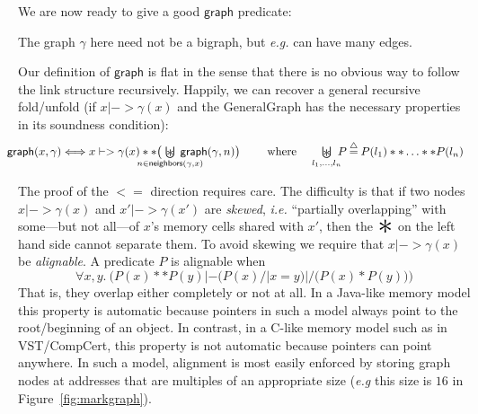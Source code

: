 \documentclass[acmsmall,screen]{acmart}
\newcommand\hide[1]{}
\newcommand{\scon}{\mathbin{\star}}
\renewcommand{\scon}{\mathbin{\ast}} \renewcommand{\bigstar}{\raisebox{-0.24em}{{\scaleobj{2.5}{\scon}}}}
\newcommand{\bigocon}{\raisebox{-0.3ex}{\resizebox{0.75em}{!}{\hspace{0.05em}$\scon$}}\hspace{-2.18ex} \bigcup}
\newcommand{\defeq}{\mathbin{\stackrel{\triangle}{=}}}
\newcommand{\p}[1]{\ensuremath{\mathsf{#1}}} \newcommand{\m}[1]{\ensuremath{\mathit{#1}}} \newcommand{\ma}[1]{\ensuremath{\mathcal{#1}}} \let\ramify\lightning
\begin{document}
We are now ready to give a good \p{graph} predicate:
\fi


\hide{ \vspace{-1.5ex}
\begin{equation}\label{eqn:iter_def}
  \p{graph}(x, \gamma) ~~ \defeq ~~ \underset{v \in \mathit{reach}(\gamma, x)}{\bigstar} v\mapsto\gamma(v)
\vspace{-1.5ex}
\end{equation}
$\gamma$ is a GeneralGraph and ``$x |-> \gamma(x)$'' is a predicate that says how a single node fits in memory. In Figure~\ref{fig:markgraph} it was:
\[
\exists m,l,r.~\gamma(x) = (m,l,r) /| x |-> m,-,l,r /| x\ \p{mod}\ 16 = 0
\]}
The graph $\gamma$ here need not be a bigraph, but \emph{e.g.} can have many edges.

Our definition of \p{graph} is flat in the sense that there is no obvious way to follow the link structure recursively.  Happily, we can recover a general recursive fold/unfold (if $x |-> \gamma(x)$ and the GeneralGraph has the necessary properties in its soundness condition):
\vspace{-1ex}
\begin{equation}
\label{eqn:unfold_graph}
\hspace{-1em}\begin{array}{@{}lc@{\hspace{1pt}}c@{\hspace{1pt}}l@{}}
\p{graph}(x,\gamma)  <=>  x |-> \gamma(x) ** \big(\!\!\!\!\!\!\!\!\!\!\!\!\!\underset{n \in \p{neighbors}(\gamma,x)}{\bigocon}\!\!\!\!\!\!\!\!\!\!\!\! \p{graph}(\gamma,n) \big)
\quad \text{~~~ where ~~ }\underset{l_1,\dots,l_n}{\raisebox{-0.3ex}{\resizebox{0.75em}{!}{\hspace{0.05em}$\scon$}}\hspace{-2.18ex} \bigcup} \! \! P  \defeq  P(l_1) ** \ldots ** P(l_n) \end{array}
\vspace{-1ex}
\end{equation}

The proof of the $<=$ direction requires care. The difficulty is that if two nodes $x |-> \gamma(x)$ and $x' |-> \gamma(x')$ are \emph{skewed}, \emph{i.e.} ``partially overlapping'' with some---but not all---of $x$'s memory cells shared with $x'$, then the $\bigstar$ on the left hand side cannot separate them.  To avoid skewing we require that $x |-> \gamma(x)$ be \emph{alignable}. A predicate $P$ is alignable when
\[
\forall x,y.~ \Big(P(x) ** P(y) |- \big(P(x) /| x = y\big) |/ \big(P(x) * P(y)\big)\Big)
\]
That is, they overlap either completely or not at all. In a Java-like memory model this property is automatic because pointers in such a model always point to the root/beginning of an object.  In contrast, in a C-like memory model such as in VST/CompCert, this property is not automatic because pointers can point anywhere.  In such a model, alignment is most easily enforced by storing graph nodes at addresses that are multiples of an appropriate size (\emph{e.g} this size is $16$ in Figure~\ref{fig:markgraph}).
\end{document}
